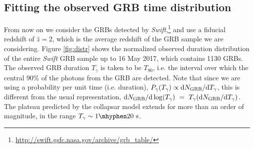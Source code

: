 \documentclass[useAMS,usenatbib]{mn2e}
\begin{document}
\subsection{Fitting the observed GRB time distribution}

From now on we consider the GRBs detected by {\it Swift},\footnote{\url{http://swift.gsfc.nasa.gov/archive/grb_table/}} and use a fiducial redshift of $\hat{z}=2$, which is the average redshift of the GRB sample we are considering. Figure \ref{fig:distr} shows the normalized observed duration distribution of the entire {\it Swift} GRB sample up to 16 May 2017, which contains 1130 GRBs. The observed GRB duration $T_\gamma$ is taken to be $T_{90}$, i.e. the interval over which the central 90\% of the photons from the GRB are detected. Note that since we are using a probability per unit time (i.e. duration), $P_\gamma(T_\gamma)\propto \text{d}N_{\rm GRB}/\text{d}T_\gamma$, this is different from the usual representation, $\text{d}N_{\rm GRB}/\text{d}\log(T_\gamma)~=~T_\gamma(\text{d}N_{\rm GRB}/\text{d}T_\gamma)$. The plateau predicted by the collapsar model extends for more than an order of magnitude, in the range $T_\gamma\sim 1\mhyphen20\text{ s}$.
\end{document}
